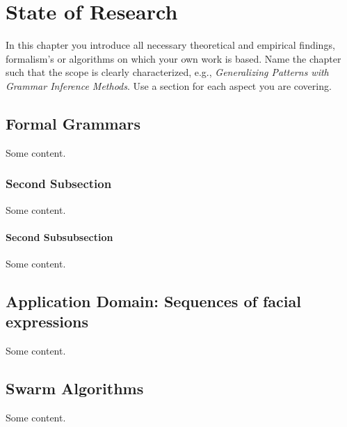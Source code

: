 \chapter{State of Research} \label{chapter_two}

In this chapter you introduce all necessary theoretical and empirical findings, formalism's or algorithms on which your own work is based. Name the chapter such that the scope is clearly characterized, e.g., {\em Generalizing Patterns with Grammar Inference Methods}. Use a section for each aspect you are covering.

\section{Formal Grammars}

Some content.
\subsection{Second Subsection}

Some content.
\subsubsection{Second Subsubsection}

Some content.
\section{Application Domain: Sequences of facial expressions}

Some content.
\section{Swarm Algorithms}

Some content.


